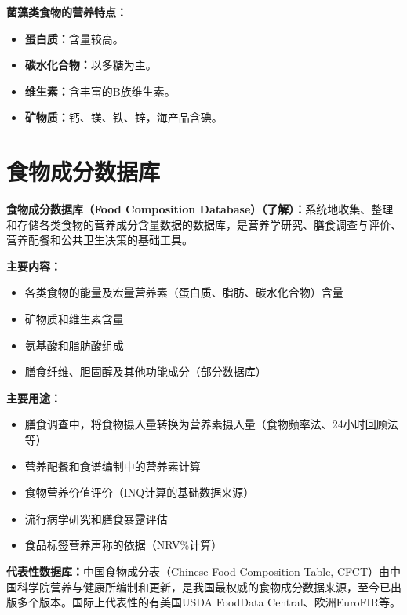 \begin{tipbox}
\textbf{菌藻类食物的营养特点：}
\begin{itemize}[leftmargin=*]
    \item \textbf{蛋白质：}含量较高。
    \item \textbf{碳水化合物：}以多糖为主。
    \item \textbf{维生素：}含丰富的B族维生素。
    \item \textbf{矿物质：}钙、镁、铁、锌，海产品含碘。
\end{itemize}
\end{tipbox}

\section{食物成分数据库}

\begin{tipbox}
\textbf{食物成分数据库（Food Composition Database）（了解）：}系统地收集、整理和存储各类食物的营养成分含量数据的数据库，是营养学研究、膳食调查与评价、营养配餐和公共卫生决策的基础工具。

\textbf{主要内容：}
\begin{itemize}[leftmargin=*]
    \item 各类食物的能量及宏量营养素（蛋白质、脂肪、碳水化合物）含量
    \item 矿物质和维生素含量
    \item 氨基酸和脂肪酸组成
    \item 膳食纤维、胆固醇及其他功能成分（部分数据库）
\end{itemize}

\textbf{主要用途：}
\begin{itemize}[leftmargin=*]
    \item 膳食调查中，将食物摄入量转换为营养素摄入量（食物频率法、24小时回顾法等）
    \item 营养配餐和食谱编制中的营养素计算
    \item 食物营养价值评价（INQ计算的基础数据来源）
    \item 流行病学研究和膳食暴露评估
    \item 食品标签营养声称的依据（NRV\%计算）
\end{itemize}

\textbf{代表性数据库：}中国食物成分表（Chinese Food Composition Table, CFCT）由中国科学院营养与健康所编制和更新，是我国最权威的食物成分数据来源，至今已出版多个版本。国际上代表性的有美国USDA FoodData Central、欧洲EuroFIR等。
\end{tipbox}

